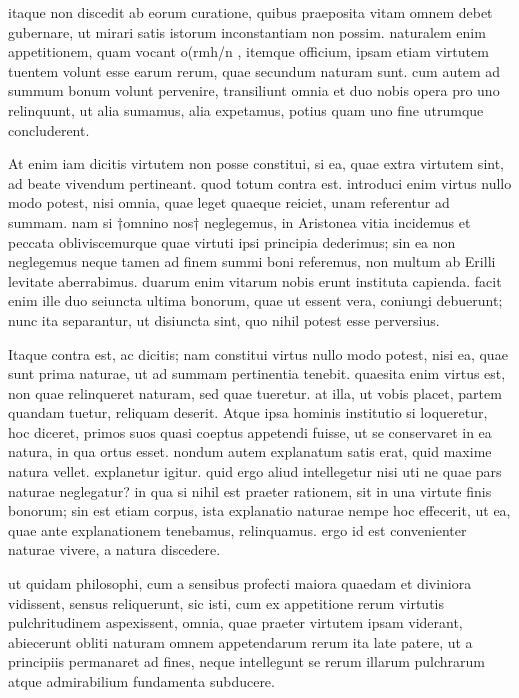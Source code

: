 itaque non discedit ab eorum curatione, quibus praeposita vitam omnem debet gubernare, ut mirari satis istorum inconstantiam non possim. naturalem enim appetitionem, quam vocant o(rmh/n , itemque officium, ipsam etiam virtutem tuentem volunt esse earum rerum, quae secundum naturam sunt. cum autem ad summum bonum volunt pervenire, transiliunt omnia et duo nobis opera pro uno relinquunt, ut alia sumamus, alia expetamus, potius quam uno fine utrumque concluderent.

 At enim iam dicitis virtutem non posse constitui, si ea, quae extra virtutem sint, ad beate vivendum pertineant. quod totum contra est. introduci enim virtus nullo modo potest, nisi omnia, quae leget quaeque reiciet, unam referentur ad summam. nam si †omnino nos† neglegemus, in Aristonea vitia incidemus et peccata obliviscemurque quae virtuti ipsi principia dederimus; sin ea non neglegemus neque tamen ad finem summi boni referemus, non multum ab Erilli levitate aberrabimus. duarum enim vitarum nobis erunt instituta capienda. facit enim ille duo seiuncta ultima bonorum, quae ut essent vera, coniungi debuerunt; nunc ita separantur, ut disiuncta sint, quo nihil potest esse perversius.

 Itaque contra est, ac dicitis; nam constitui virtus nullo modo potest, nisi ea, quae sunt prima naturae, ut ad summam pertinentia tenebit. quaesita enim virtus est, non quae relinqueret naturam, sed quae tueretur. at illa, ut vobis placet, partem quandam tuetur, reliquam deserit. Atque ipsa hominis institutio si loqueretur, hoc diceret, primos suos quasi coeptus appetendi fuisse, ut se conservaret in ea natura, in qua ortus esset. nondum autem explanatum satis erat, quid maxime natura vellet. explanetur igitur. quid ergo aliud intellegetur nisi uti ne quae pars naturae neglegatur? in qua si nihil est praeter rationem, sit in una virtute finis bonorum; sin est etiam corpus, ista explanatio naturae nempe hoc effecerit, ut ea, quae ante explanationem tenebamus, relinquamus. ergo id est convenienter naturae vivere, a natura discedere.

 ut quidam philosophi, cum a sensibus profecti maiora quaedam et diviniora vidissent, sensus reliquerunt, sic isti, cum ex appetitione rerum virtutis pulchritudinem aspexissent, omnia, quae praeter virtutem ipsam viderant, abiecerunt obliti naturam omnem appetendarum rerum ita late patere, ut a principiis permanaret ad fines, neque intellegunt se rerum illarum pulchrarum atque admirabilium fundamenta subducere.

